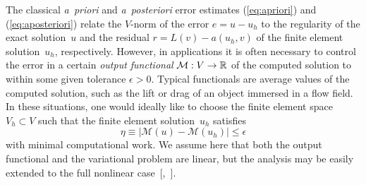 The classical \emph{a~priori} and \emph{a~posteriori} error estimates
(\ref{eq:apriori}) and (\ref{eq:aposteriori}) relate the $V$-norm of
the error $e = u - u_h$ to the regularity of the exact solution~$u$
and the residual $r = L(v) - a(u_h, v)$ of the finite element
solution~$u_h$, respectively. However, in applications it is often
necessary to control the error in a certain \emph{output functional}
$\mathcal{M} : V \rightarrow \mathbb{R}$ of the computed solution to within
some given tolerance $\epsilon > 0$. Typical functionals are average
values of the computed solution, such as the lift or drag of an object
immersed in a flow field. In these situations, one would ideally like
to choose the finite element space $V_h \subset V$ such that the
finite element solution~$u_h$ satisfies
\begin{equation}
  \eta \equiv |\mathcal{M}(u) - \mathcal{M}(u_h)| \leqslant \epsilon
\end{equation}
with minimal computational work. We assume here that both the output
functional and the variational problem are linear, but the analysis
may be easily extended to the\vadjust{\pagebreak} full nonlinear
case~[\citeauthor{ErikssonEstepHansboEtAl1995}\citeyear{ErikssonEstepHansboEtAl1995},\,\citeauthor{BeckerRannacher2001}
\citeyear{BeckerRannacher2001}].

